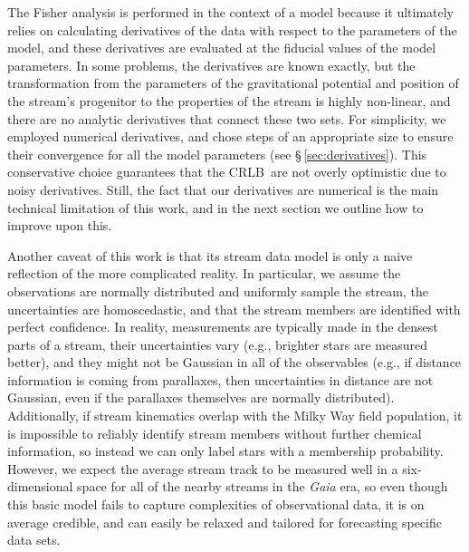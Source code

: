 \documentclass[modern]{aastex62}
\newcommand{\acronym}[1]{{\small{#1}}}
\newcommand{\CRLB}{\acronym{CRLB}}
\begin{document}
The Fisher analysis is performed in the context of a model because it ultimately relies on calculating derivatives of the data with respect to the parameters of the model, and these derivatives are evaluated at the fiducial values of the model parameters.
In some problems, the derivatives are known exactly, but the transformation from the parameters of the gravitational potential and position of the stream's progenitor to the properties of the stream is highly non-linear, and there are no analytic derivatives that connect these two sets.
For simplicity, we employed numerical derivatives, and chose steps of an appropriate size to ensure their convergence for all the model parameters (see \S\,\ref{sec:derivatives}).
This conservative choice guarantees that the \CRLB\ are not overly optimistic due to noisy derivatives.
Still, the fact that our derivatives are numerical is the main technical limitation of this work, and in the next section we outline how to improve upon this.

Another caveat of this work is that its stream data model is only a naive reflection of the more complicated reality. 
In particular, we assume the observations are normally distributed and uniformly sample the stream, the uncertainties are homoscedastic, and that the stream members are identified with perfect confidence. 
In reality, measurements are typically made in the densest parts of a stream, their uncertainties vary (e.g., brighter stars are measured better), and they might not be Gaussian in all of the observables (e.g., if distance information is coming from parallaxes, then uncertainties in distance are not Gaussian, even if the parallaxes themselves are normally distributed).
Additionally, if stream kinematics overlap with the Milky Way field population, it is impossible to reliably identify stream members without further chemical information, so instead we can only label stars with a membership probability.
However, we expect the average stream track to be measured well in a six-dimensional space for all of the nearby streams in the \emph{Gaia} era, so even though this basic model fails to capture complexities of observational data, it is on average credible, and can easily be relaxed and tailored for forecasting specific data sets.
\end{document}
